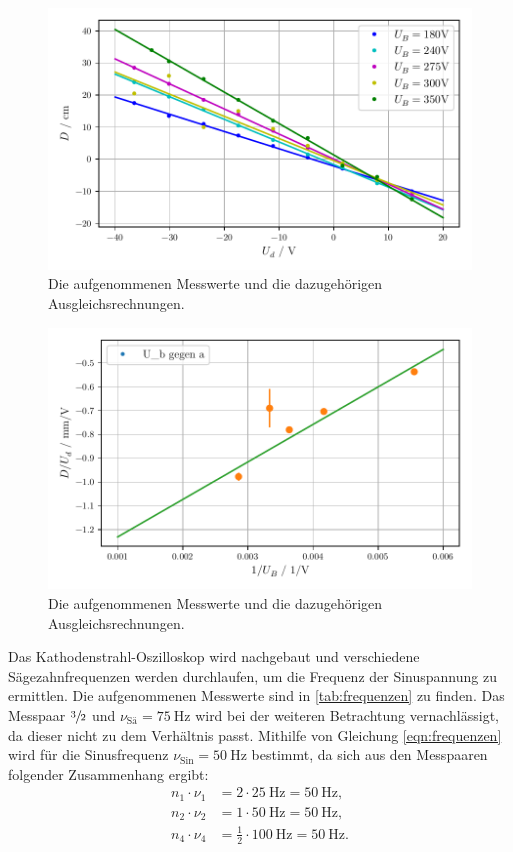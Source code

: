 \begin{figure} 
    \centering
    \includegraphics[width=\textwidth]{bilder/E_Feld_Teil_1.pdf}
    \caption{Die aufgenommenen Messwerte und die dazugehörigen Ausgleichsrechnungen.}
    \label{fig:eFeldTeil1a}
\end{figure}

\begin{figure} 
    \centering
    \includegraphics[width=\textwidth]{bilder/E_Feld_Teil_1_2.pdf}
    \caption{Die aufgenommenen Messwerte und die dazugehörigen Ausgleichsrechnungen.}
    \label{fig:eFeldTeil1b}
\end{figure}

Das Kathodenstrahl-Oszilloskop wird nachgebaut und verschiedene Sägezahnfrequenzen werden durchlaufen, um die Frequenz der Sinuspannung zu ermittlen.
Die aufgenommenen Messwerte sind in \autoref{tab:frequenzen} zu finden.
Das Messpaar $\sfrac{3}{2}$ und $\nu_\text{Sä} = \SI{75}{\hertz}$ wird bei der weiteren Betrachtung vernachlässigt, da dieser nicht zu dem Verhältnis passt.
Mithilfe von Gleichung \eqref{eqn:frequenzen} wird für die Sinusfrequenz $\nu_\text{Sin} = \SI{50}{\hertz}$ bestimmt, da sich aus den Messpaaren folgender Zusammenhang ergibt:
\begin{align*}
    n_1 \cdot \nu_1 &= 2 \cdot \SI{25}{\hertz} = \SI{50}{\hertz}, \\
    n_2 \cdot \nu_2 &= 1 \cdot \SI{50}{\hertz} = \SI{50}{\hertz}, \\
    n_4 \cdot \nu_4 &=  \frac{1}{2} \cdot \SI{100}{\hertz} = \SI{50}{\hertz}.
\end{align*}


